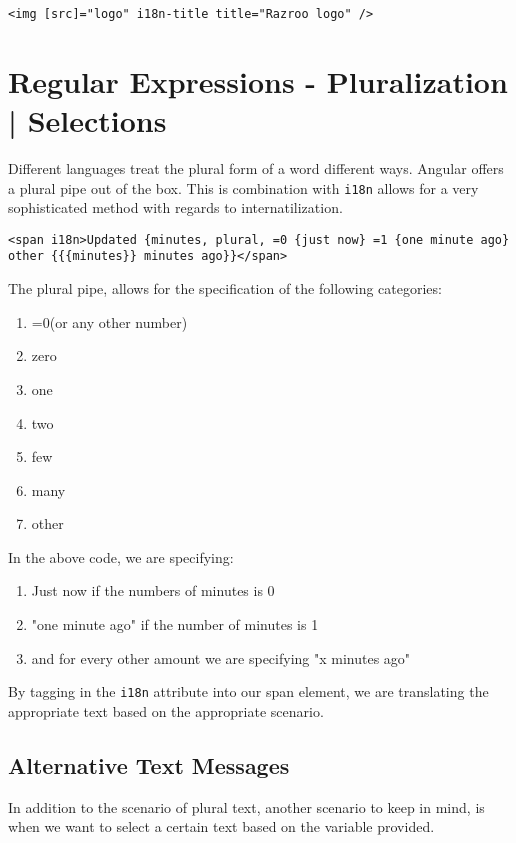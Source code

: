 \begin{lstlisting}
<img [src]="logo" i18n-title title="Razroo logo" />
\end{lstlisting}

\section{ Regular Expressions - Pluralization | Selections }
Different languages treat the plural form of a word different ways. Angular 
offers a plural pipe out of the box. This is combination with \lstinline{i18n}
allows for a very sophisticated method with regards to internatilization. 

\begin{lstlisting}
<span i18n>Updated {minutes, plural, =0 {just now} =1 {one minute ago} other {{{minutes}} minutes ago}}</span>
\end{lstlisting}

The plural pipe, allows for the specification of the following categories: 
\begin{enumerate}
\item =0(or any other number)  
\item zero  
\item one
\item two
\item few
\item many
\item other
\end{enumerate}

In the above code, we are specifying: 
\begin{enumerate}
\item Just now if the numbers of minutes is 0 
\item "one minute ago" if the number of minutes is 1
\item and for every other amount we are specifying "x minutes ago" 
\end{enumerate}

By tagging in the \lstinline{i18n} attribute into our span element, we are 
translating the appropriate text based on the appropriate scenario. 

\subsection{Alternative Text Messages}
In addition to the scenario of plural text, another scenario to keep in mind, 
is when we want to select a certain text based on the variable provided. 

